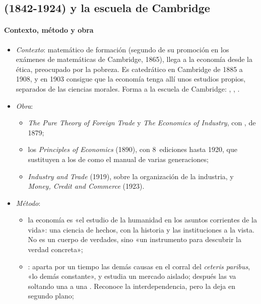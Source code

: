 \documentclass[11pt]{article}
\begin{document}
\subsection{ (1842-1924) y la escuela de Cambridge}\label{sec:marshall}

\paragraph{Contexto, método y obra}

\begin{itemize}
\item \emph{Contexto}: matemático de formación (segundo de su promoción en los exámenes de matemáticas de Cambridge, 1865), llega a la economía desde la ética, preocupado por la pobreza. Es catedrático en Cambridge de 1885 a 1908, y en 1903 consigue que la economía tenga allí unos estudios propios, separados de las ciencias morales. Forma a la escuela de Cambridge: , , .
\item \emph{Obra}:
  \begin{itemize}
  \item \emph{The Pure Theory of Foreign Trade} y \emph{The Economics of Industry}, con , de 1879\nocite{Marshall1879Pure};
  \item los \emph{Principles of Economics} (1890)\nocite{Marshall1890Principles}, con 8~ediciones hasta 1920, que sustituyen a los de \textcite{Mill1848Principles} como el manual de varias generaciones;
  \item \emph{Industry and Trade} (1919)\nocite{Marshall1919Industry}, sobre la organización de la industria, y \emph{Money, Credit and Commerce} (1923)\nocite{Marshall1923}.
  \end{itemize}
\item \emph{Método}:
  \begin{itemize}
  \item la economía es «el estudio de la humanidad en los asuntos corrientes de la vida»\nocite{Marshall1890Principles}: una ciencia de hechos, con la historia y las instituciones a la vista. No es un cuerpo de verdades, sino «un instrumento para descubrir la verdad concreta»\nocite{Pigou1925Memorials};
  \item {}: aparta por un tiempo las demás causas en el corral del \emph{ceteris paribus}, «lo demás constante», y estudia un mercado aislado; después las va soltando una a una\nocite{Marshall1890Principles} . Reconoce la interdependencia, pero la deja en segundo plano;

\end{itemize}
\end{itemize}
\end{document}
